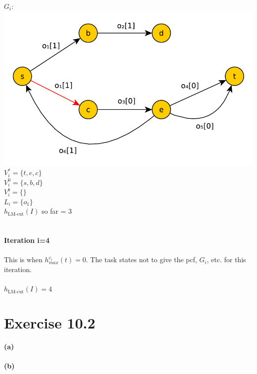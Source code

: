 \documentclass[11pt,a4paper]{article}
\begin{document}
\\
$G_i:$\\
\includegraphics[scale=0.5]{jugraph3}\\
$V^*_i=\{t,e,c\}$\\
$V^0_i=\{s,b,d\}$\\
$V^b_i=\{\}$\\
$L_i=\{o_1\}$\\
$h_{\text{LM-cut}}(I)$ so far = 3\\
\\
\\
\textbf{Iteration i=4}\\
\\
This is when $h^{c_i}_{max}(t)=0$. The task states not to give the pcf, $G_i$, etc. for this iteration.\\
\\
$h_{\text{LM-cut}}(I)=4$

\section*{Exercise 10.2}
\textbf{(a)} \\
\\
\textbf{(b)} \\

\label{lastpage}
\end{document}
